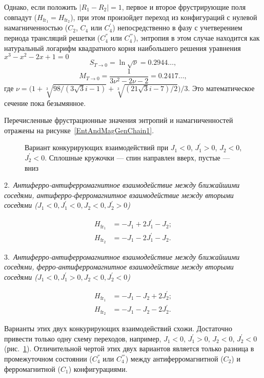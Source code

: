 Однако, если положить $|R_1 - R_2| = 1$, первое и второе фрустрирующие поля совпадут ($H_{\text{fr}_1} = H_{\text{fr}_2}$), при этом произойдет переход из конфигураций с нулевой намагниченностью ($C_2$, $C_4$ или $C_4^{'}$) непосредственно в фазу с учетверением периода трансляций решетки ($C_4^{''}$ или $C_4^{'''}$), энтропия в этом случае находится как натуральный логарифм квадратного корня наибольшего решения уравнения $x^3-x^2-2x+1=0$
\begin{equation}
S_{T\rightarrow 0} = \ln \sqrt{\nu} = 0.2944\dots,
\label{26}
\end{equation}
\begin{equation}
M_{T\rightarrow 0} = \frac{1}{3\nu^2-2\nu-2} = 0.2417\dots,
\label{27}
\end{equation}
где $\nu = \Big(1+\sqrt[3]{98/(3\sqrt{3}i-1)}+\sqrt[3]{(21\sqrt{3}i-7)/2}\Big)/3$. Это математическое сечение пока безымянное.

Перечисленные фрустрационные значения энтропий и намагниченностей отражены на рисунке~\ref{EntAndMagGenChain1}.

 \begin{figure}[h]
 	\caption{Вариант конкурирующих взаимодействий при $J_1 < 0$, $J_1^{'} > 0$, $J_2 < 0$, $J_2^{'} < 0$. Сплошные кружочки --- спин направлен вверх, пустые --- вниз}
 	\label{transGenChain2}
 \end{figure}

2.~\emph{Антиферро-антиферромагнитное взаимодействие между ближайшими соседями, антиферро-ферромагнитное взаимодействие между вторыми соседями ($J_1<0, J_{1}^{'}<0, J_{2}<0, J_{2}^{'}>0$)}

\[
\begin{aligned}
H_{\text{fr}_1}&=-J_1+2J_{1}^{'}-J_{2};\\
H_{\text{fr}_2}&= -J_1-2J_1^{'}-J_2.
\end{aligned}
\]

3.~\emph{Антиферро-антиферромагнитное взаимодействие между ближайшими соседями, ферро-антиферромагнитное взаимодействие между вторыми соседями ($J_1<0, J_{1}^{'}>0, J_{2}<0, J_{2}^{'}<0$)}

\[
\begin{aligned}
H_{\text{fr}_1}&=-J_1-J_{2}+2J_{2}^{'};\\
H_{\text{fr}_2}&= -J_1-J_2-2J_2^{'}.
\end{aligned}
\]

Варианты этих двух конкурирующих взаимодействий схожи. Достаточно привести только одну схему переходов, например, $J_1 < 0$, $J_1^{'} > 0$, $J_2 < 0$, $J_2^{'} < 0$ (рис.~\ref{transGenChain2}). Отличительной чертой этих двух вариантов является только разница в промежуточном состоянии ($C_4^{''}$ или $C_4^{'''}$) между антиферромагнитной ($C_2$) и ферромагнитной ($C_1$) конфигурациями.

